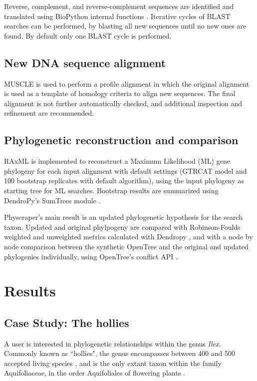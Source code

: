 \documentclass{bmcart}
\begin{document}
Reverse, complement, and reverse-complement sequences are identified and translated
using BioPython internal functions \cite{cock2009biopython}.
Iterative cycles of BLAST searches can be performed, by blasting all new sequences
until no new ones are found. By default only one BLAST cycle is performed.

\subsection*{New DNA sequence alignment}

MUSCLE \cite{edgar2004muscle} is used to perform a profile alignment in which the
original alignment is used as a template of homology criteria to align new sequences.
The final alignment is not further automatically checked, and additional inspection
and refinement are recommended.

\subsection*{Phylogenetic reconstruction and comparison}

RAxML \cite{stamatakis2014raxml} is implemented to reconstruct a Maximum Likelihood
(ML) gene phylogeny for each input alignment with default settings (GTRCAT model and
100 bootstrap replicates with default algorithm), using the input phylogeny as starting
tree for ML searches.
Bootstrap results are summarized using DendroPy's SumTrees module
\cite{sukumaran2010dendropy}.

Physcraper's main result is an updated phylogenetic hypothesis for the search taxon.
Updated and original phylpogeny are compared with Robinson-Foulds weighted and unweighted
metrics calculated with Dendropy \cite{sukumaran2010dendropy}, and with a node by node
comparison between the synthetic OpenTree and the original and updated phylogenies individually,
using OpenTree's conflict API \cite{redelings2017supertree}.


\section*{Results}
\subsection*{Case Study: The hollies}

A user is interested in phylogenetic relationships within the genus \textit{Ilex}. Commonly
known as ``hollies", the genus encompasses between 400 \cite{gottlieb2005molecular}
and 500 accepted living species \cite{plantlist}, and is
the only extant taxon within the family Aquifoliaceae, in the order Aquifoliales of flowering
plants \cite{chase2016update}.
\end{document}

